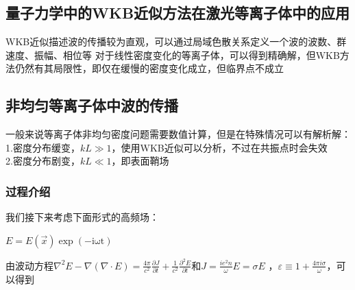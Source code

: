 \documentclass[12pt, a4paper, oneside]{ctexart}
\begin{document}
\begin{spacing}{2.0}
\section{量子力学中的WKB近似方法在激光等离子体中的应用}
WKB近似描述波的传播较为直观，可以通过局域色散关系定义一个波的波数、群速度、振幅、相位等
对于线性密度变化的等离子体，可以得到精确解，但WKB方法仍然有其局限性，即仅在缓慢的密度变化成立，但临界点不成立
\subsection{非均匀等离子体中波的传播}
一般来说等离子体非均匀密度问题需要数值计算，但是在特殊情况可以有解析解：
1.密度分布缓变，$kL\gg 1$，使用WKB近似可以分析，不过在共振点时会失效\cite{lasertextbook11223}
\\
2.密度分布剧变，$kL\ll 1$，即表面鞘场
\subsubsection{过程介绍}
我们接下来考虑下面形式的高频场：
\begin{center}
    $\displaystyle E = E(\vec{x})\exp (-\mathrm{i\omega t})$
\end{center}
由波动方程$\displaystyle \nabla^{2}E-\nabla(\nabla\cdot E)=\frac{4\pi}{c^{2}}\frac{\partial J}{\partial t}+\frac{1}{c^{2}}\frac{\partial^{2}E}{\partial t}$和$\displaystyle J = \frac{ie^2n}{\omega}E = \sigma E$
，$\displaystyle \varepsilon\equiv 1+\frac{4\pi i \sigma}{\omega}$，可以得到


\end{spacing}
\end{document}
